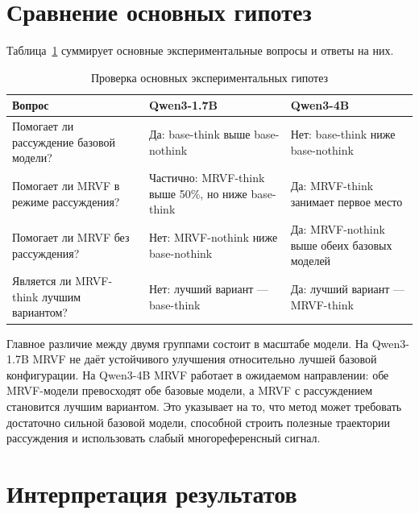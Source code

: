 \section{Сравнение основных гипотез}

Таблица~\ref{tab:hypothesis-summary} суммирует основные экспериментальные вопросы и ответы на них.

\begin{table}[h]
  \centering
  \caption{Проверка основных экспериментальных гипотез}
  \label{tab:hypothesis-summary}
  \begin{tabular}{p{5.2cm}p{4.6cm}p{4.2cm}}
    \hline
    Вопрос                                             & Qwen3-1.7B & Qwen3-4B \\
    \hline
    Помогает ли рассуждение базовой модели?            &
    Да: base-think выше base-nothink                   &
    Нет: base-think ниже base-nothink                                          \\
    \hline
    Помогает ли MRVF в режиме рассуждения?             &
    Частично: MRVF-think выше 50\%, но ниже base-think &
    Да: MRVF-think занимает первое место                                       \\
    \hline
    Помогает ли MRVF без рассуждения?                  &
    Нет: MRVF-nothink ниже base-nothink                &
    Да: MRVF-nothink выше обеих базовых моделей                                \\
    \hline
    Является ли MRVF-think лучшим вариантом?           &
    Нет: лучший вариант --- base-think                 &
    Да: лучший вариант --- MRVF-think                                          \\
    \hline
  \end{tabular}
\end{table}

Главное различие между двумя группами состоит в масштабе модели. На Qwen3-1.7B MRVF не даёт устойчивого улучшения относительно лучшей базовой конфигурации. На Qwen3-4B MRVF работает в ожидаемом направлении: обе MRVF-модели превосходят обе базовые модели, а MRVF с рассуждением становится лучшим вариантом. Это указывает на то, что метод может требовать достаточно сильной базовой модели, способной строить полезные траектории рассуждения и использовать слабый многореференсный сигнал.

\section{Интерпретация результатов}

